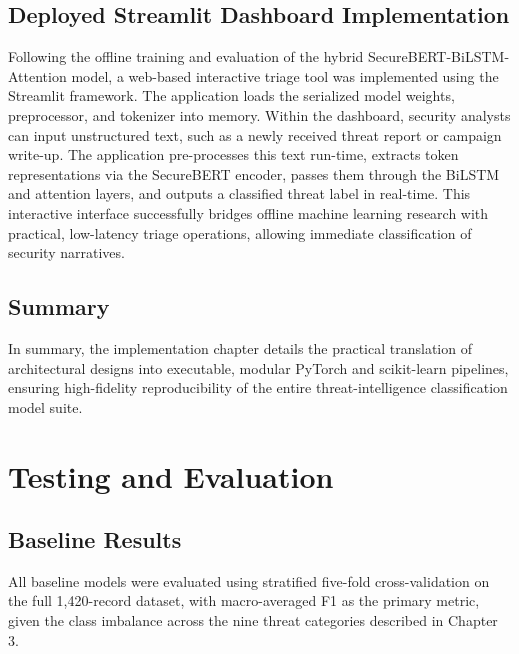 \documentclass[12pt,a4paper]{report}
\begin{document}
\section{Deployed Streamlit Dashboard
Implementation}\label{deployed-streamlit-dashboard-implementation}

Following the offline training and evaluation of the hybrid
SecureBERT-BiLSTM-Attention model, a web-based interactive triage tool
was implemented using the Streamlit framework. The application loads the
serialized model weights, preprocessor, and tokenizer into memory.
Within the dashboard, security analysts can input unstructured text,
such as a newly received threat report or campaign write-up. The
application pre-processes this text run-time, extracts token
representations via the SecureBERT encoder, passes them through the
BiLSTM and attention layers, and outputs a classified threat label in
real-time. This interactive interface successfully bridges offline
machine learning research with practical, low-latency triage operations,
allowing immediate classification of security narratives.
\section{Summary}\label{summary-2}

In summary, the implementation chapter details the practical translation
of architectural designs into executable, modular PyTorch and
scikit-learn pipelines, ensuring high-fidelity reproducibility of the
entire threat-intelligence classification model suite.
\chapter{Testing and Evaluation}
\section{Baseline Results}\label{baseline-results}

All baseline models were evaluated using stratified five-fold
cross-validation on the full 1,420-record dataset, with macro-averaged
F1 as the primary metric, given the class imbalance across the nine
threat categories described in Chapter 3.
\end{document}
